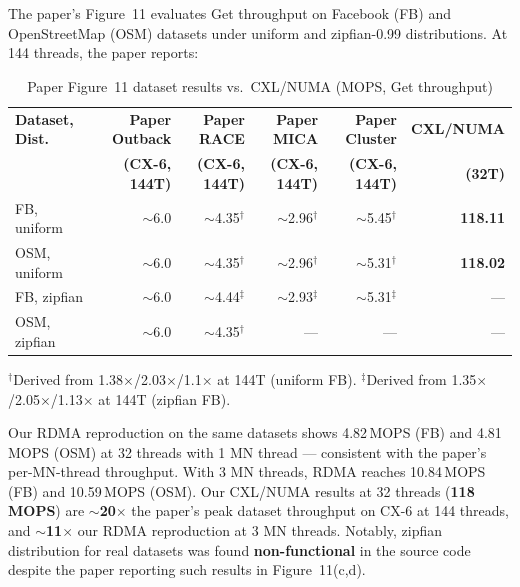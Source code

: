 \documentclass[conference]{IEEEtran}
\begin{document}
The paper's Figure~11 evaluates Get throughput on Facebook (FB) and OpenStreetMap (OSM) datasets under uniform and zipfian-0.99 distributions. At 144 threads, the paper reports:

\begin{table}[H]
\centering
\caption{Paper Figure~11 dataset results vs.\ CXL/NUMA (MOPS, Get throughput)}
\label{tab:paper-fig11}
\small
\begin{tabular}{@{}lrrrrr@{}}
\toprule
\textbf{Dataset, Dist.} & \textbf{Paper Outback} & \textbf{Paper RACE} & \textbf{Paper MICA} & \textbf{Paper Cluster} & \textbf{CXL/NUMA} \\
 & \textbf{(CX-6, 144T)} & \textbf{(CX-6, 144T)} & \textbf{(CX-6, 144T)} & \textbf{(CX-6, 144T)} & \textbf{(32T)} \\
\midrule
FB, uniform & $\sim$6.0 & $\sim$4.35$^\dagger$ & $\sim$2.96$^\dagger$ & $\sim$5.45$^\dagger$ & \textbf{118.11} \\
OSM, uniform & $\sim$6.0 & $\sim$4.35$^\dagger$ & $\sim$2.96$^\dagger$ & $\sim$5.31$^\dagger$ & \textbf{118.02} \\
FB, zipfian & $\sim$6.0 & $\sim$4.44$^\ddagger$ & $\sim$2.93$^\ddagger$ & $\sim$5.31$^\ddagger$ & --- \\
OSM, zipfian & $\sim$6.0 & $\sim$4.35$^\dagger$ & --- & --- & --- \\
\bottomrule
\end{tabular}

\vspace{2pt}
{\scriptsize $^\dagger$Derived from 1.38$\times$/2.03$\times$/1.1$\times$ at 144T (uniform FB). \quad $^\ddagger$Derived from 1.35$\times$/2.05$\times$/1.13$\times$ at 144T (zipfian FB).}
\end{table}

Our RDMA reproduction on the same datasets shows 4.82\,MOPS (FB) and 4.81\,MOPS (OSM) at 32 threads with 1 MN thread --- consistent with the paper's per-MN-thread throughput. With 3 MN threads, RDMA reaches 10.84\,MOPS (FB) and 10.59\,MOPS (OSM). Our CXL/NUMA results at 32 threads (\textbf{118\,MOPS}) are \textbf{$\sim$20$\times$} the paper's peak dataset throughput on CX-6 at 144 threads, and \textbf{$\sim$11$\times$} our RDMA reproduction at 3 MN threads. Notably, zipfian distribution for real datasets was found \textbf{non-functional} in the source code despite the paper reporting such results in Figure~11(c,d).
\end{document}
